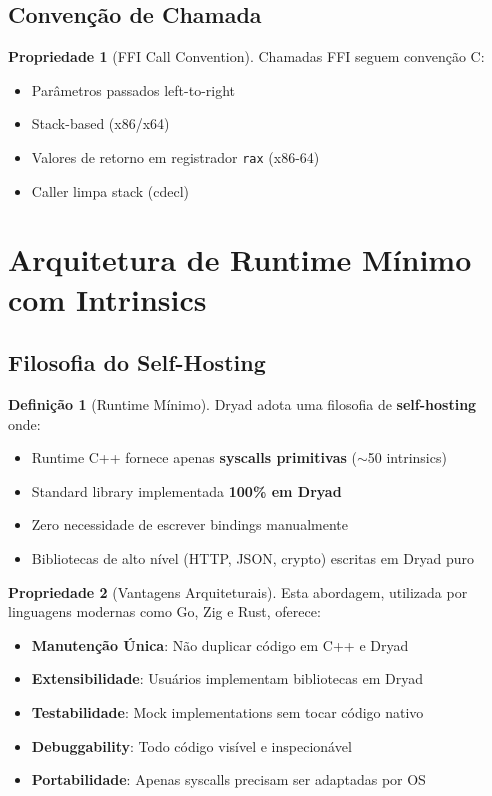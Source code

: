 \documentclass[12pt,a4paper]{article}
\theoremstyle{definition}
\newtheorem{definition}{Definição}[section]
\newtheorem{property}{Propriedade}[section]
\begin{document}
\subsection{Convenção de Chamada}

\begin{property}[FFI Call Convention]
Chamadas FFI seguem convenção C:
\begin{itemize}
    \item Parâmetros passados left-to-right
    \item Stack-based (x86/x64)
    \item Valores de retorno em registrador \texttt{rax} (x86-64)
    \item Caller limpa stack (cdecl)
\end{itemize}
\end{property}

\section{Arquitetura de Runtime Mínimo com Intrinsics}

\subsection{Filosofia do Self-Hosting}

\begin{definition}[Runtime Mínimo]
Dryad adota uma filosofia de \textbf{self-hosting} onde:
\begin{itemize}
    \item Runtime C++ fornece apenas \textbf{syscalls primitivas} ($\sim$50 intrinsics)
    \item Standard library implementada \textbf{100\% em Dryad}
    \item Zero necessidade de escrever bindings manualmente
    \item Bibliotecas de alto nível (HTTP, JSON, crypto) escritas em Dryad puro
\end{itemize}
\end{definition}

\begin{property}[Vantagens Arquiteturais]
Esta abordagem, utilizada por linguagens modernas como Go, Zig e Rust, oferece:
\begin{itemize}
    \item \textbf{Manutenção Única}: Não duplicar código em C++ e Dryad
    \item \textbf{Extensibilidade}: Usuários implementam bibliotecas em Dryad
    \item \textbf{Testabilidade}: Mock implementations sem tocar código nativo
    \item \textbf{Debuggability}: Todo código visível e inspecionável
    \item \textbf{Portabilidade}: Apenas syscalls precisam ser adaptadas por OS
\end{itemize}
\end{property}
\end{document}

